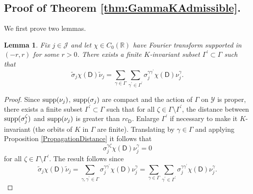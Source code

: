 \documentclass[11pt,reqno]{amsart}
\newtheorem{lemma}[theorem]{Lemma}
\theoremstyle{definition}
\theoremstyle{remark}
\newcommand{\ti}[1]{\widetilde{#1}}
\newcommand{\st}[1]{\mathsf{#1}}
\def\Y{\ensuremath{\mathcal{Y}}}
\def\J{\ensuremath{\mathcal{J}}}
\def\bR{\ensuremath{\mathbb{R}}}
\def\supp{\ensuremath{\textnormal{supp}}}
\begin{document}
\subsection{Proof of Theorem \ref{thm:GammaKAdmissible}.}
We first prove two lemmas.
\begin{lemma}
\label{lem:finitesum}
Fix $j \in \J$ and let $\chi \in C_0(\bR)$ have Fourier transform supported in $(-r,r)$ for some $r>0$.  There exists a finite $K$-invariant subset $\Gamma^\prime \subset \Gamma$ such that
\[ \ti{\sigma}_j \chi(\st{D}) \ti{\nu}_j=\sum_{\gamma \in \Gamma}\sum_{\gamma^\prime \in \Gamma^\prime} \sigma_j^{\gamma \gamma^\prime} \chi(\st{D})\nu_j^{\gamma}.\]
\end{lemma}
\begin{proof}
Since $\supp(\nu_j)$, $\supp(\sigma_j)$ are compact and the action of $\Gamma$ on $\Y$ is proper, there exists a finite subset $\Gamma^\prime \subset \Gamma$ such that for all $\zeta \in \Gamma \setminus \Gamma^\prime$, the distance between $\supp(\sigma_j^\zeta)$ and $\supp(\nu_j)$ is greater than $rc_{\st{D}}$.  Enlarge $\Gamma^\prime$ if necessary to make it $K$-invariant (the orbits of $K$ in $\Gamma$ are finite). Translating by $\gamma \in \Gamma$ and applying Proposition \ref{PropagationDistance} it follows that
\[ \sigma_j^{\gamma \zeta} \chi(\st{D})\nu_j^\gamma=0 \]
for all $\zeta \in \Gamma \setminus \Gamma^\prime$.  The result follows since
\[ \ti{\sigma}_j \chi(\st{D})\ti{\nu}_j=\sum_{\gamma, \gamma^\prime \in \Gamma} \sigma_j^{\gamma \gamma^\prime}\chi(\st{D})\nu_j^\gamma=\sum_{\gamma \in \Gamma}\sum_{\gamma^\prime \in \Gamma^\prime}\sigma_j^{\gamma \gamma^\prime}\chi(\st{D})\nu_j^\gamma.\]
\end{proof}
\end{document}
